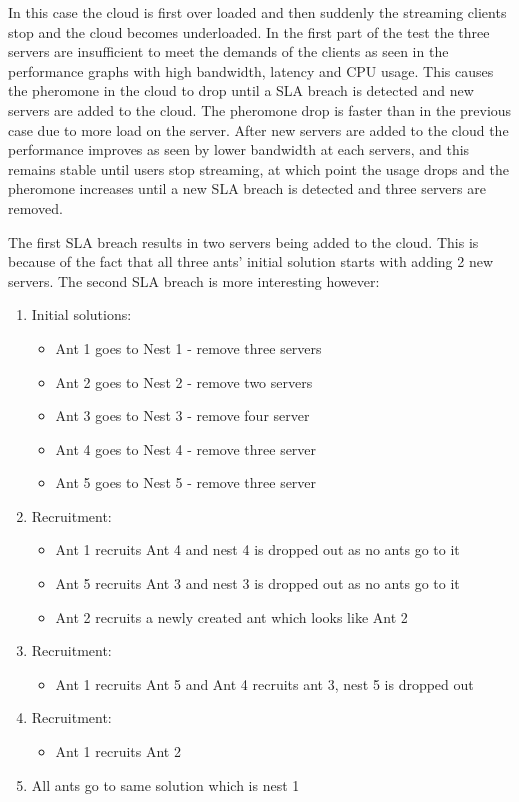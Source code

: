 In this case the cloud is first over loaded and then suddenly the streaming clients stop and the cloud becomes underloaded. In the first part of the test the three servers are insufficient to meet the demands of the clients as seen in the performance graphs with high bandwidth, latency and CPU usage. This causes the pheromone in the cloud to drop until a SLA breach is detected and new servers are added to the cloud. The pheromone drop is faster than in the previous case due to more load on the server. After new servers are added to the cloud the performance improves as seen by lower bandwidth at each servers, and this remains stable until users stop streaming, at which point the usage drops and the pheromone increases until a new SLA breach is detected and three servers are removed.

The first SLA breach results in two servers being added to the cloud. This is because of the fact that all three ants' initial solution starts with adding 2 new servers. The second SLA breach is more interesting however:

\begin{enumerate}
	\item Initial solutions: 
	\begin{itemize}
		\item Ant 1 goes to Nest 1 - remove three servers
		\item Ant 2 goes to Nest 2 - remove two servers
		\item Ant 3 goes to Nest 3 - remove four server
		\item Ant 4 goes to Nest 4 - remove three server
		\item Ant 5 goes to Nest 5 - remove three server
	\end{itemize}
	\item Recruitment:
	\begin{itemize}
		\item Ant 1 recruits Ant 4 and nest 4 is dropped out as no ants go to it
		\item Ant 5 recruits Ant 3 and nest 3 is dropped out as no ants go to it
		\item Ant 2 recruits a newly created ant which looks like Ant 2
	\end{itemize}
	\item Recruitment:
	\begin{itemize}
		\item Ant 1 recruits Ant 5 and Ant 4 recruits ant 3, nest 5 is dropped out
	\end{itemize}
	\item Recruitment:
	\begin{itemize}
		\item Ant 1 recruits Ant 2
	\end{itemize}
	\item All ants go to same solution which is nest 1
\end{enumerate}

